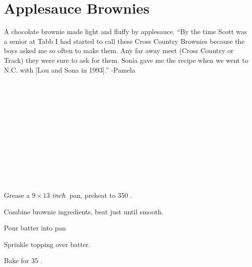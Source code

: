 \section[Applesauce Brownies]{Applesauce
Brownies}

\begin{recipestats}[
        servings=16,
        preptime=15~\minute,
        bakingtime=35~\minute,
        source=Pam \& Sonia,
    ]
\end{recipestats}

\begin{recipeabstract}
    A chocolate brownie made light and fluffy by applesauce.
    ``By the time Scott was a senior at Tabb I had started to call these
    Cross Country Brownies because the boys asked me so often to make them.
    Any far away meet (Cross Country or Track) they were sure to ask for them.
    Sonia gave me the recipe when we went to N.C. with [Lou and Sona in 1993].'' -Pamela
\end{recipeabstract}

\begin{ingredientcolumns}
    \begin{ingredientblock}[brownie]
        \\
        \\
        \\
        \\
        \\
        \\
        \\
        \\
    \end{ingredientblock}

    \begin{ingredientblock}[topping]
        \\
        \\
    \end{ingredientblock}
\end{ingredientcolumns}

\begin{preparation}
\item Grease a $9\times13$ $inch$~pan, preheat to $350$ \Fahrenheit.
\item Combine brownie ingredients, beat just until smooth.
\item Pour batter into pan
\item Sprinkle topping over batter.
\item Bake for 35 \minute.
\end{preparation}

\recipeend%
